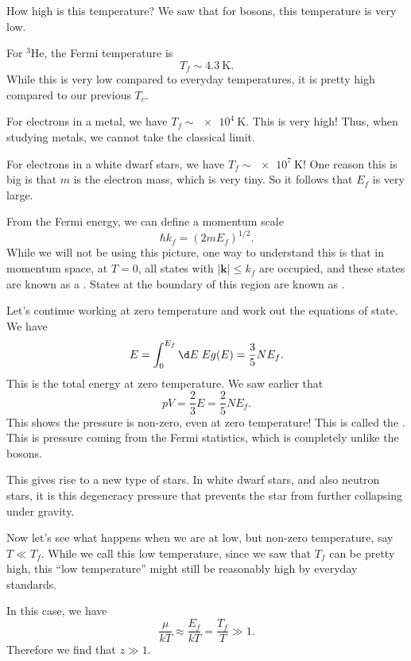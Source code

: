 \documentclass[a4paper]{article}
\begin{document}
How high is this temperature? We saw that for bosons, this temperature is very low.
\begin{eg}
  For $^3$He, the Fermi temperature is
  \[
    T_f \sim \SI{4.3}{\kelvin}.
  \]
  While this is very low compared to everyday temperatures, it is pretty high compared to our previous $T_c$.

  For electrons in a metal, we have $T_f \sim \SI{e4}{\kelvin}$. This is very high! Thus, when studying metals, we cannot take the classical limit.

  For electrons in a white dwarf stars, we have $T_f \sim \SI{e7}{\kelvin}$! One reason this is big is that $m$ is the electron mass, which is very tiny. So it follows that $E_f$ is very large.
\end{eg}

From the Fermi energy, we can define a momentum scale
\[
  \hbar k_f = (2m E_f)^{1/2}.
\]
While we will not be using this picture, one way to understand this is that in momentum space, at $T = 0$, all states with $|\mathbf{k}| \leq k_f$ are occupied, and these states are known as a . States at the boundary of this region are known as .

Let's continue working at zero temperature and work out the equations of state. We have
\[
  E = \int_0^{E_f} \d E\; E g(E) = \frac{3}{5}NE_f.
\]
This is the total energy at zero temperature. We saw earlier that
\[
  pV = \frac{2}{3} E = \frac{2}{5} N E_f.
\]
This shows the pressure is non-zero, even at zero temperature! This is called the . This is pressure coming from the Fermi statistics, which is completely unlike the bosons.

This gives rise to a new type of stars. In white dwarf stars, and also neutron stars, it is this degeneracy pressure that prevents the star from further collapsing under gravity.

Now let's see what happens when we are at low, but non-zero temperature, say $T \ll T_f$. While we call this low temperature, since we saw that $T_f$ can be pretty high, this ``low temperature'' might still be reasonably high by everyday standards.

In this case, we have
\[
  \frac{\mu}{kT} \approx \frac{E_f}{kT} = \frac{T_f}{T} \gg 1.
\]
Therefore we find that $z \gg 1$.
\end{document}
